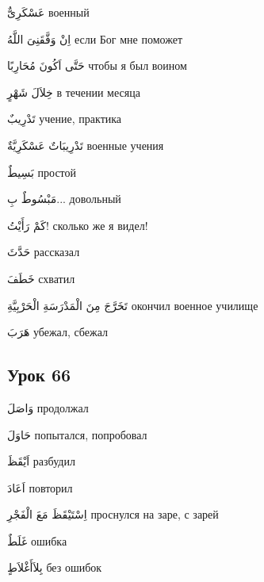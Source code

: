 \documentclass[a5paper]{article}
\newcommand\textstyleDropCaps[1]{#1}
\newcommand\textstyleCaptioncharacters[1]{#1}
\begin{document}
\textstyleCaptioncharacters{عَسْكَرِىٌّ }\textstyleDropCaps{военный‎}

\textstyleCaptioncharacters{اِنْ وَفَّقَنِىَ اللَّهُ }\textstyleDropCaps{если Бог мне поможет‎}

\textstyleCaptioncharacters{حَتَّى اَكُونَ مُحَارِبًا }\textstyleDropCaps{чтобы я был воином‎}

\textstyleCaptioncharacters{خِلاَلَ شَهْرٍ }\textstyleDropCaps{в течении месяца‎}

\textstyleCaptioncharacters{تَدْرِيبٌ }\textstyleDropCaps{учение, практика‎}

\textstyleCaptioncharacters{تَدْرِيبَاتٌ عَسْكَرِيَّةٌ }\textstyleDropCaps{во­енные учения‎}

\textstyleCaptioncharacters{بَسِيطٌ }\textstyleDropCaps{простой‎}

\textstyleCaptioncharacters{مَبْسُوطٌ بِ... }\textstyleDropCaps{доволь­ный‎}

\textstyleCaptioncharacters{كَمْ رَأَيْتُ!ِ }\textstyleDropCaps{сколько же я видел!‎}

\textstyleCaptioncharacters{حَدَّثَ }\textstyleDropCaps{рассказал‎}

\textstyleCaptioncharacters{خَطَفَ }\textstyleDropCaps{схватил‎}

\textstyleCaptioncharacters{تَخَرَّجَ مِنَ الْمَدْرَسَةِ الْحَرْبِيَّةِ }\textstyleDropCaps{окончил военное училище‎}

\textstyleCaptioncharacters{هَرَبَ }\textstyleDropCaps{убежал, сбежал‎}

\subsection[Урок 66‎]{\textstyleDropCaps{Урок 66‎}}
\textstyleCaptioncharacters{وَاصَلَ }\textstyleDropCaps{продолжал‎}

\textstyleCaptioncharacters{حَاوَلَ }\textstyleDropCaps{попытался, попро­бовал‎}

\textstyleCaptioncharacters{اَيْقَظَ }\textstyleDropCaps{разбудил‎}

\textstyleCaptioncharacters{اَعَادَ }\textstyleDropCaps{повторил‎}

\textstyleCaptioncharacters{اِسْتَيْقَظَ مَعَ الْفَجْرِ }\textstyleDropCaps{проснулся на заре, с зарей‎}

\textstyleCaptioncharacters{غَلَطٌ }\textstyleDropCaps{ошибка‎}

\textstyleCaptioncharacters{بِلاَأَغْلاَطٍ }\textstyleDropCaps{без ошибок‎}
\end{document}
